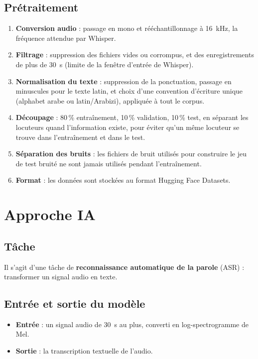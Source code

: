 \documentclass[12pt,a4paper]{report}
\begin{document}
\section{Prétraitement}
\begin{enumerate}
  \item \textbf{Conversion audio} : passage en mono et rééchantillonnage à 16~kHz,
        la fréquence attendue par Whisper.
  \item \textbf{Filtrage} : suppression des fichiers vides ou corrompus, et des
        enregistrements de plus de 30~s (limite de la fenêtre d'entrée de Whisper).
  \item \textbf{Normalisation du texte} : suppression de la ponctuation, passage en
        minuscules pour le texte latin, et choix d'une convention d'écriture unique
        (alphabet arabe ou latin/Arabizi), appliquée à tout le corpus.
  \item \textbf{Découpage} : 80\,\% entraînement, 10\,\% validation, 10\,\% test,
        en séparant les locuteurs quand l'information existe, pour éviter qu'un
        même locuteur se trouve dans l'entraînement et dans le test.
  \item \textbf{Séparation des bruits} : les fichiers de bruit utilisés pour
        construire le jeu de test bruité ne sont jamais utilisés pendant
        l'entraînement.
  \item \textbf{Format} : les données sont stockées au format Hugging Face
        Datasets.
\end{enumerate}

\chapter{Approche IA}

\section{Tâche}
Il s'agit d'une tâche de \textbf{reconnaissance automatique de la parole} (ASR) :
transformer un signal audio en texte.

\section{Entrée et sortie du modèle}
\begin{itemize}
  \item \textbf{Entrée} : un signal audio de 30~s au plus, converti en
        log-spectrogramme de Mel.
  \item \textbf{Sortie} : la transcription textuelle de l'audio.
\end{itemize}
\end{document}
